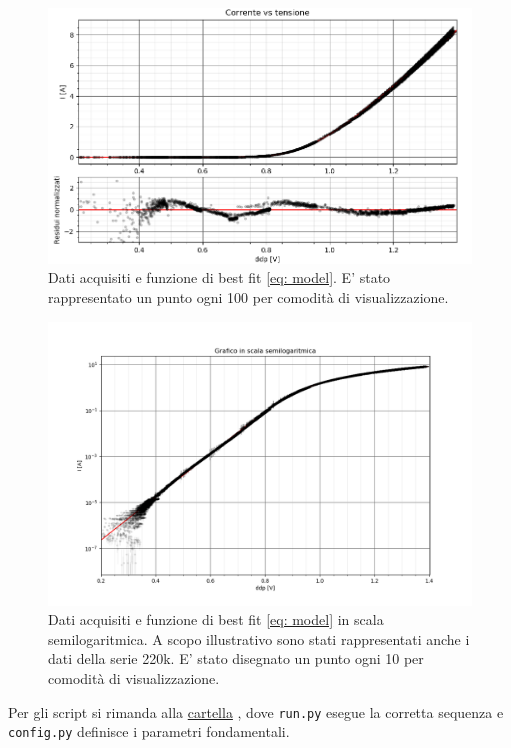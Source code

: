 \documentclass{article}[a4paper, oneside, 11pt]
\begin{document}
\vspace{-0.5cm}
\begin{figure}[H]
	\centering 
 		\includegraphics[scale=0.65]{./Figure_4_2_Nskip_100_NO_220k.png}
	\caption{Dati acquisiti e funzione di best fit \eqref{eq: model}. E' 
	stato rappresentato un punto ogni 100 per comodità di visualizzazione.
	\label{fig: sck_lin}}
\end{figure}


\begin{figure}[H]
	\centering 
 		\includegraphics[scale=0.6]{./Figure_3_1_Nskip_10.png}
	\caption{Dati acquisiti e funzione di best fit \eqref{eq: model} in 
	scala semilogaritmica. A scopo illustrativo sono stati rappresentati anche i dati della serie 220k. E' stato disegnato un punto ogni 10 per comodità di visualizzazione. \label{fig: sck_log}}
\end{figure}

Per gli script si rimanda alla 
\href{https://github.com/LucaCiucci/relaz_seme/tree/master/Cartella_fit}{cartella}
, dove \verb+run.py+ esegue la corretta sequenza e \verb+config.py+ definisce 
i parametri fondamentali.
\end{document}
